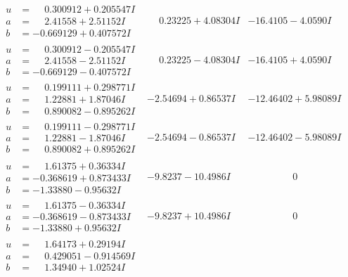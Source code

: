 \documentclass[1p]{elsarticle_modified}
\theoremstyle{definition}
\begin{document}
$$\begin{array}{c|c|c}
\begin{aligned}
u &= \phantom{-}0.300912 + 0.205547 I \\
a &= \phantom{-}2.41558 + 2.51152 I \\
b &= -0.669129 + 0.407572 I\end{aligned}
 & \phantom{-}0.23225 + 4.08304 I & -16.4105 - 4.0590 I \\ \hline\begin{aligned}
u &= \phantom{-}0.300912 - 0.205547 I \\
a &= \phantom{-}2.41558 - 2.51152 I \\
b &= -0.669129 - 0.407572 I\end{aligned}
 & \phantom{-}0.23225 - 4.08304 I & -16.4105 + 4.0590 I \\ \hline\begin{aligned}
u &= \phantom{-}0.199111 + 0.298771 I \\
a &= \phantom{-}1.22881 + 1.87046 I \\
b &= \phantom{-}0.890082 - 0.895262 I\end{aligned}
 & -2.54694 + 0.86537 I & -12.46402 + 5.98089 I \\ \hline\begin{aligned}
u &= \phantom{-}0.199111 - 0.298771 I \\
a &= \phantom{-}1.22881 - 1.87046 I \\
b &= \phantom{-}0.890082 + 0.895262 I\end{aligned}
 & -2.54694 - 0.86537 I & -12.46402 - 5.98089 I \\ \hline\begin{aligned}
u &= \phantom{-}1.61375 + 0.36334 I \\
a &= -0.368619 + 0.873433 I \\
b &= -1.33880 - 0.95632 I\end{aligned}
 & -9.8237 - 10.4986 I & \phantom{-0.000000 } 0 \\ \hline\begin{aligned}
u &= \phantom{-}1.61375 - 0.36334 I \\
a &= -0.368619 - 0.873433 I \\
b &= -1.33880 + 0.95632 I\end{aligned}
 & -9.8237 + 10.4986 I & \phantom{-0.000000 } 0 \\ \hline\begin{aligned}
u &= \phantom{-}1.64173 + 0.29194 I \\
a &= \phantom{-}0.429051 - 0.914569 I \\
b &= \phantom{-}1.34940 + 1.02524 I\end{aligned}

\end{array}$$
\end{document}
